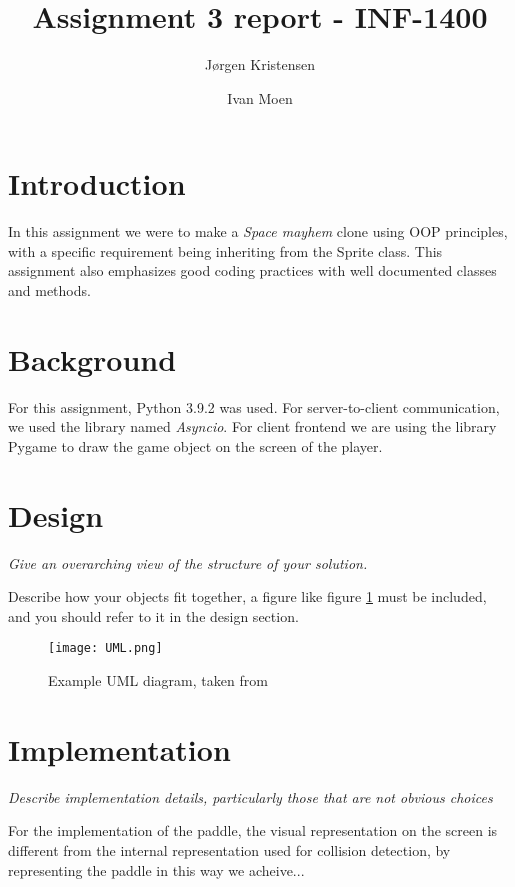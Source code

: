 \documentclass[11pt]{article}
\title{Assignment 3 report - INF-1400}
\author{Jørgen Kristensen \and Ivan Moen}
\begin{document}
\maketitle

\section{Introduction}

In this assignment we were to make a \emph{Space mayhem} clone using OOP principles, with a specific requirement being inheriting from the Sprite class. This assignment also emphasizes good coding practices with well documented classes and methods.

\section{Background}


For this assignment, Python 3.9.2 was used. For server-to-client communication, we used the library named \emph{Asyncio}. For client frontend we are using the library Pygame to draw the game object on the screen of the player.

\section{Design}

\emph{Give an overarching view of the structure of your solution.}

Describe how your objects fit together, a figure like figure \ref{umlfig} must be included, and you should refer to it in the design section.

\begin{figure}[h]
	\centering
	\texttt{[image: UML.png]}
	\caption{Example UML diagram, taken from \cite{umlsource}}
	\label{umlfig}
\end{figure}

\section{Implementation}

\emph{Describe implementation details, particularly those that are not obvious choices}

For the implementation of the paddle, the visual representation on the screen is different from the internal representation used for collision detection, by representing the paddle in this way we acheive...
\end{document}
